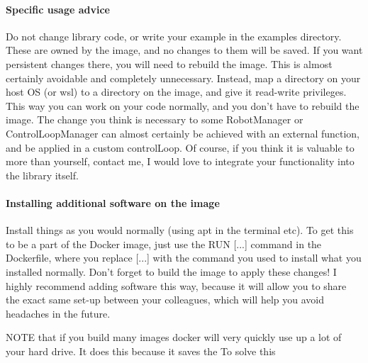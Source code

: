 \paragraph{Specific usage advice}
Do not change library code, or write your example in the examples directory.
These are owned by the image, and no changes to them will be saved.
If you want persistent changes there, you will need to rebuild the image.
This is almost certainly avoidable and completely unnecessary. 
Instead, map a directory on your host OS (or wsl) to a directory on the image,
and give it read-write privileges. This way you can work on your code
normally, and you don't have to rebuild the image.
The change you think is necessary to some RobotManager or ControlLoopManager can almost 
certainly be achieved with an external function, and be applied
in a custom controlLoop.
Of course, if you think it is valuable to more than yourself,
contact me, I would love to integrate your functionality into the library itself.

\paragraph{Installing additional software on the image}
Install things as you would normally (using apt in the terminal etc).
To get this to be a part of the Docker image, just use
the RUN [...] command in the Dockerfile, where you replace [...] with the
command you used to install what you installed normally.
Don't forget to build the image to apply these changes!
I highly recommend adding software this way, because
it will allow you to share the exact same set-up between your colleagues,
which will help you avoid headaches in the future.

NOTE that if you build many images docker will very quickly use up a lot of your hard drive. 
It does this because it saves the 
To solve this

